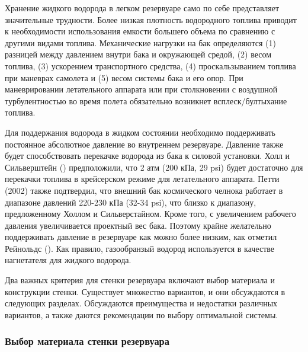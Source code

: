 Хранение жидкого водорода в легком резервуаре само по себе представляет значительные трудности. Более низкая плотность водородного топлива приводит к необходимости использования емкости большего объема по сравнению с другими видами топлива. Механические нагрузки на бак определяются (1) разницей между давлением внутри бака и окружающей средой, (2) весом топлива, (3) ускорением транспортного средства, (4) проскальзыванием топлива при маневрах самолета и (5) весом системы бака и его опор. При маневрировании летательного аппарата или при столкновении с воздушной турбулентностью во время полета обязательно возникнет всплеск/бултыхание топлива.

Для поддержания водорода в жидком состоянии необходимо поддерживать постоянное абсолютное давление во внутреннем резервуаре. Давление также будет способствовать перекачке водорода из бака к силовой установки. Холл и Сильверштейн (\cite{hallsilverstein1955}) предположили, что 2 атм (200 кПа, 29 psi) будет достаточно для перекачки топлива в крейсерском режиме для летательного аппарата. Петти (2002) также подтвердил, что внешний бак космического челнока работает в диапазоне давлений 220-230 кПа (32-34 psi), что близко к диапазону, предложенному Холлом и Сильверстайном. Кроме того, с увеличением рабочего давления увеличивается проектный вес бака. Поэтому крайне желательно поддерживать давление в резервуаре как можно более низким, как отметил Рейнольдс (\cite{reynolds1955}). Как правило, газообранзый водород используется в качестве нагнетателя для жидкого водорода.

Два важных критерия для стенки резервуара включают выбор материала и конструкции стенки. Существует множество вариантов, и они обсуждаются в следующих разделах. Обсуждаются преимущества и недостатки различных вариантов, а также даются рекомендации по выбору оптимальной системы.

\subsubsection{Выбор материала стенки резервуара}\label{ch:overview:1:sec4:sub2:subsub1}

